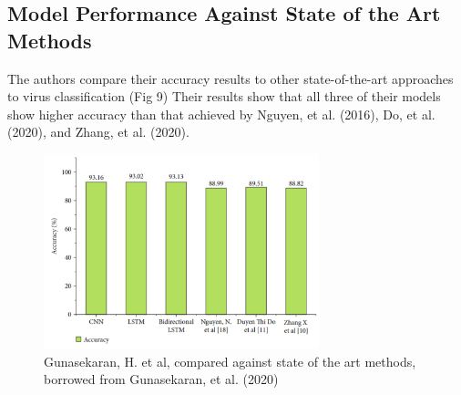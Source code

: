\documentclass[journal]{IEEEtran}
\begin{document}
\subsection{Model Performance Against State of the Art Methods}

The authors compare their accuracy results to other state-of-the-art approaches to 
virus classification (Fig 9) Their results show that all three of their models show higher accuracy than
that achieved by Nguyen, et al. (2016), Do, et al. (2020), and Zhang, et al. (2020).

\begin{figure}
  \centering
  \includegraphics[width=8cm]{figures/accuracy_compared_to_state_of_art.png}
  \caption{Gunasekaran, H. et al, compared against state of the art methods, borrowed from Gunasekaran, et al. (2020)}
\end{figure}


 

 
\end{document}
